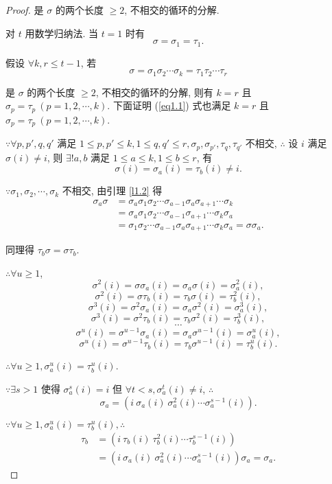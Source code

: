 \documentclass{ctexart}
\begin{document}
\begin{proof}
    是 $\sigma$ 的两个长度 $\geq2$, 不相交的循环的分解.

    对 $t$ 用数学归纳法. 当 $t=1$ 时有
    \[\sigma=\sigma_1=\tau_1.\]

    假设 $\forall k,r\leq t-1$, 若
    \[\sigma=\sigma_1\sigma_2\cdots\sigma_k=\tau_1\tau_2\cdots\tau_r\]

    是 $\sigma$ 的两个长度 $\geq2$, 不相交的循环的分解, 则有 $k=r$ 且 $\sigma_p=\tau_p\ (p=1,2,\cdots,k)$. 下面证明 (\ref{eq1.1}) 式也满足 $k=r$ 且 $\sigma_p=\tau_p\ (p=1,2,\cdots,k)$.

    $\because\forall p,p',q,q'$ 满足 $1\leq p,p'\leq k,1\leq q,q'\leq r,\sigma_p,\sigma_{p'},\tau_q,\tau_{q'}$ 不相交, $\therefore$ 设 $i$ 满足 $\sigma(i)\neq i$, 则 $\exists!a,b$ 满足 $1\leq a\leq k,1\leq b\leq r$, 有
    \[\sigma(i)=\sigma_a(i)=\tau_b(i)\neq i.\]

    $\because\sigma_1,\sigma_2,\cdots,\sigma_k$ 不相交, 由引理 \ref{l1.2} 得
    \begin{align*}
        \sigma_{a}\sigma & =\sigma_{a}\sigma_1\sigma_2\cdots\sigma_{a-1}\sigma_{a}\sigma_{a+1}\cdots\sigma_k \\
        & =\sigma_{a}\sigma_1\sigma_2\cdots\sigma_{a-1}\sigma_{a+1}\cdots\sigma_k\sigma_{a} \\
        & =\sigma_1\sigma_2\cdots\sigma_{a-1}\sigma_{a}\sigma_{a+1}\cdots\sigma_k\sigma_{a}=\sigma\sigma_{a}.
    \end{align*}

    同理得 $\tau_b\sigma=\sigma\tau_b$.

    $\therefore\forall u\geq1$,
    \[\sigma^2(i)=\sigma\sigma_a(i)=\sigma_a\sigma(i)=\sigma_a^2(i),\]
    \[\sigma^2(i)=\sigma\tau_b(i)=\tau_b\sigma(i)=\tau_b^2(i),\]
    \[\sigma^3(i)=\sigma^2\sigma_a(i)=\sigma_a\sigma^2(i)=\sigma_a^3(i),\]
    \[\sigma^3(i)=\sigma^2\tau_b(i)=\tau_b\sigma^2(i)=\tau_b^3(i),\]
    \[\cdots\]
    \[\sigma^u(i)=\sigma^{u-1}\sigma_a(i)=\sigma_a\sigma^{u-1}(i)=\sigma_a^u(i),\]
    \[\sigma^u(i)=\sigma^{u-1}\tau_b(i)=\tau_b\sigma^{u-1}(i)=\tau_b^u(i).\]

    $\therefore\forall u\geq1,\sigma_a^u(i)=\tau_b^u(i)$.

    $\because\exists s>1$ 使得 $\sigma_a^s(i)=i$ 但 $\forall t<s,\sigma_a^t(i)\neq i$, $\therefore$
    \[\sigma_a=(i\ \sigma_a(i)\ \sigma_a^2(i)\cdots\sigma_a^{s-1}(i)).\]

    $\because\forall u\geq1,\sigma_a^u(i)=\tau_b^u(i),\therefore$
    \begin{align*}
        \tau_b & =(i\ \tau_b(i)\ \tau_b^2(i)\cdots\tau_b^{s-1}(i)) \\
        & =(i\ \sigma_a(i)\ \sigma_a^2(i)\cdots\sigma_a^{s-1}(i))\sigma_a=\sigma_a.
    \end{align*}


\end{proof}
\end{document}
